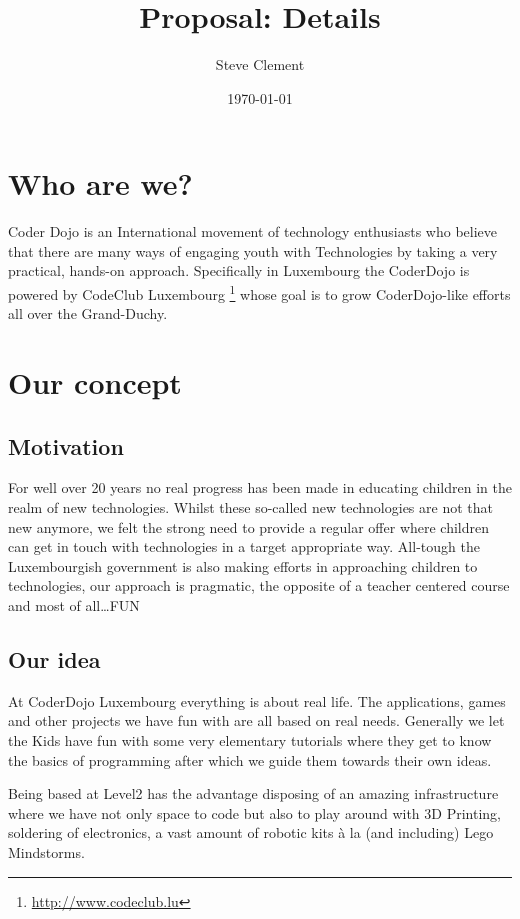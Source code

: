 \documentclass{proposal}
\title{Proposal: Details}
\author{Steve Clement}
\date{\today}
\begin{document}
\newpage

\maketitle

\newpage

\section*{Who are we?}

Coder Dojo is an International movement of technology enthusiasts who believe that there are many ways of engaging youth with Technologies by taking a very practical, hands-on approach.
Specifically in Luxembourg the CoderDojo is powered by CodeClub Luxembourg \footnote{\url{http://www.codeclub.lu}} whose goal is to grow CoderDojo-like efforts all over the Grand-Duchy.

\section*{Our concept}

\subsection*{Motivation}
For well over 20 years no real progress has been made in educating children in the realm of new technologies.
Whilst these so-called new technologies are not that new anymore, we felt the strong need to provide a regular offer where children can get in touch with technologies in a target appropriate way.
All-tough the Luxembourgish government is also making efforts in approaching children to technologies, our approach is pragmatic, the opposite of a teacher centered course and most of all\ldots FUN

\subsection*{Our idea}
At CoderDojo Luxembourg everything is about real life. The applications, games and other projects we have fun with are all based on real needs. Generally we let the Kids have fun with some very elementary tutorials where they get to know the basics of programming after which we guide them towards their own ideas.

Being based at Level2 has the advantage disposing of an amazing infrastructure where we have not only space to code but also to play around with 3D Printing, soldering of electronics, a vast amount of robotic kits à la (and including) Lego Mindstorms.
\end{document}
